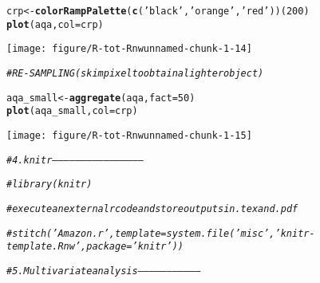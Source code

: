 \documentclass{article}\usepackage[]{graphicx}\usepackage[]{color}
\makeatletter
\newcommand{\hlnum}[1]{\textcolor[rgb]{0.686,0.059,0.569}{#1}}%
\newcommand{\hlstr}[1]{\textcolor[rgb]{0.192,0.494,0.8}{#1}}%
\newcommand{\hlcom}[1]{\textcolor[rgb]{0.678,0.584,0.686}{\textit{#1}}}%
\newcommand{\hlstd}[1]{\textcolor[rgb]{0.345,0.345,0.345}{#1}}%
\newcommand{\hlkwb}[1]{\textcolor[rgb]{0.69,0.353,0.396}{#1}}%
\newcommand{\hlkwc}[1]{\textcolor[rgb]{0.333,0.667,0.333}{#1}}%
\newcommand{\hlkwd}[1]{\textcolor[rgb]{0.737,0.353,0.396}{\textbf{#1}}}%
\newenvironment{kframe}{%
 \def\at@end@of@kframe{}%
 \ifinner\ifhmode%
  \def\at@end@of@kframe{\end{minipage}}%
  \begin{minipage}{\columnwidth}%
 \fi\fi%
 \def\FrameCommand##1{\hskip\@totalleftmargin \hskip-\fboxsep
 \colorbox{shadecolor}{##1}\hskip-\fboxsep
     \hskip-\linewidth \hskip-\@totalleftmargin \hskip\columnwidth}%
 \MakeFramed {\advance\hsize-\width
   \@totalleftmargin\z@ \linewidth\hsize
   \@setminipage}}%
 {\par\unskip\endMakeFramed%
 \at@end@of@kframe}
\newenvironment{knitrout}{}{} %
\makeatother
\begin{document}
\begin{knitrout}
\begin{kframe}
{\ttfamily\noindent{}}\begin{alltt}
\hlstd{crp} \hlkwb{<-} \hlkwd{colorRampPalette}\hlstd{(}\hlkwd{c}\hlstd{(}\hlstr{'black'}\hlstd{,} \hlstr{'orange'}\hlstd{,} \hlstr{'red'}\hlstd{))(}\hlnum{200}\hlstd{)}
\hlkwd{plot}\hlstd{(aqa,} \hlkwc{col} \hlstd{= crp)}
\end{alltt}
\end{kframe}

{\centering \texttt{[image: figure/R-tot-Rnwunnamed-chunk-1-14]} 

}


\begin{kframe}\begin{alltt}
\hlcom{# RE-SAMPLING (skim pixel to obtain a lighter object)}

\hlstd{aqa_small} \hlkwb{<-} \hlkwd{aggregate}\hlstd{(aqa,} \hlkwc{fact} \hlstd{=} \hlnum{50}\hlstd{)}
\hlkwd{plot}\hlstd{(aqa_small,} \hlkwc{col} \hlstd{= crp)}
\end{alltt}
\end{kframe}

{\centering \texttt{[image: figure/R-tot-Rnwunnamed-chunk-1-15]} 

}


\begin{kframe}\begin{alltt}
\hlcom{# 4. knitr------------------------------------------------}

\hlcom{# library(knitr)}

\hlcom{# execute an external r code and store outputs in .tex and .pdf}

\hlcom{# stitch('Amazon.r', template = system.file('misc', 'knitr-template.Rnw', package = 'knitr'))}

\hlcom{# 5. Multivariate analysis--------------------------------}


\end{alltt}
\end{kframe}
\end{knitrout}
\end{document}
